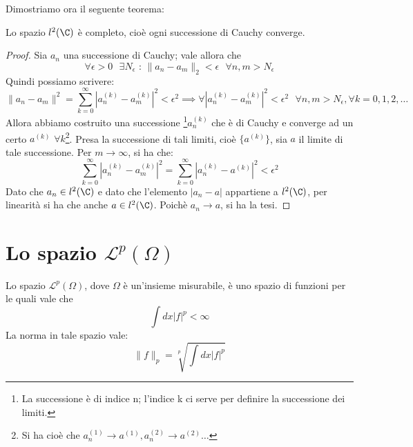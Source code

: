 Dimostriamo ora il seguente teorema:
\begin{teorema}
Lo spazio $l^2(\C)$ è completo, cioè ogni successione di Cauchy converge.
\end{teorema}
\begin{proof}
Sia $a_n$ una successione di Cauchy; vale allora che
$$\forall \epsilon >0 \text{ } \exists N_{\epsilon} \text{ : } \|a_n-a_m\|_2 <\epsilon \text{ } \forall n,m>N_{\epsilon}$$
Quindi possiamo scrivere:
$$\|a_n-a_m\|^2= \sum_{k=0} ^{\infty} |a_n ^{(k)} - a_m ^{(k)}|^2 < \epsilon ^2 \implies \forall |a_n ^{(k)} - a_m ^{(k)}|^2 < \epsilon ^2 \text{ } \forall n,m>N_{\epsilon}, \forall k=0,1,2,\dots$$
Allora abbiamo costruito una successione \footnote{La successione è di indice n; l'indice k ci serve per definire la successione dei limiti.}$a_n ^{(k)}$ che è di Cauchy e converge ad un certo $a^{(k)}$ $\forall k$\footnote{Si ha cioè che $a_n ^{(1)} \to a^{(1)}, a_n ^{(2)} \to a^{(2)} \dots$}. Presa la successione di tali limiti, cioè $\{a^{(k)}\}$, sia $a$ il limite di tale successione. Per $m \to \infty$, si ha che:
$$\sum_{k=0} ^{\infty} |a_n ^{(k)} - a_m ^{(k)}|^2= \sum_{k=0} ^{\infty} |a_n ^{(k)} - a^{(k)}|^2< \epsilon ^2$$
Dato che $a_n \in l^2(\C)$ e dato che l'elemento $|a_n -a|$ appartiene a $l^2(\C)$, per linearità si ha che  anche $a \in l^2(\C)$. Poichè $a_n \to a$, si ha la tesi.

\end{proof}

\section{Lo spazio $\mathscr{L}^p (\Omega)$}

Lo spazio  $\mathscr{L}^p (\Omega)$, dove $\Omega$ è un'insieme misurabile, è uno spazio di funzioni per le quali vale che
$$\int dx |f|^p < \infty$$
La norma in tale spazio vale:
$$\|f\| _p=\sqrt[p]{\int dx |f|^p}$$

